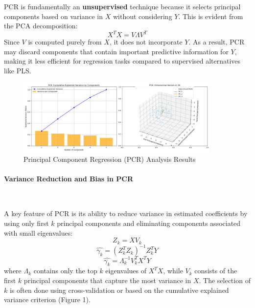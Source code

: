 \documentclass[11pt,twoside,a4paper]{article}
\begin{document}
PCR is fundamentally an \textbf{unsupervised} technique because it selects principal components based on variance in \( X \) without considering \( Y \). This is evident from the PCA decomposition:
\begin{equation}
X^T X = V \Lambda V^T
\end{equation}
Since \( V \) is computed purely from \( X \), it does not incorporate \( Y \). As a result, PCR may discard components that contain important predictive information for \( Y \), making it less efficient for regression tasks compared to supervised alternatives like PLS.

\begin{figure}[H]
    \centering
    \includegraphics[width=0.9\textwidth]{PCR_Selected_Analysis.png}
    \caption{Principal Component Regression (PCR) Analysis Results}
    \label{fig:PCR_analysis}
\end{figure}

\paragraph{Variance Reduction and Bias in PCR}  \ \

A key feature of PCR is its ability to reduce variance in estimated coefficients by using only first \( k \) principal components and eliminating components associated with small eigenvalues:
   \begin{equation}
    Z_k = X V_k
    \end{equation}
    \begin{equation}
\hat{\gamma_k} = (Z_k^T Z_k)^{-1} Z_k^T Y
\end{equation}
\begin{equation}
\hat{\gamma_k}  = \Lambda_k^{-1} V_k^T X^T Y
\end{equation}
    where \( \Lambda_k \) contains only the top \( k \) eigenvalues of \( X^T X \), while \( V_k \) consists of the first \( k \) principal components that capture the most variance in \( X \). The selection of \( k \) is often done using cross-validation or based on the cumulative explained variance criterion (Figure 1).
\end{document}
